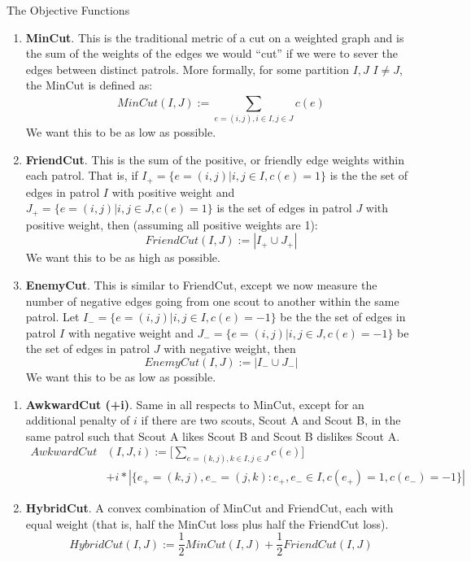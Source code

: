 \documentclass{beamer}
\begin{document}
\begin{frame}{The Objective Functions}

\begin{enumerate}
\scriptsize
\item \textbf{MinCut}. This is the traditional metric of a cut on a weighted graph and is the sum of the weights of the edges we would ``cut'' if we were to sever the edges between distinct patrols. More formally, for some partition $I, J$ $I \neq J$, the MinCut is defined as:
$$
MinCut(I, J) := \sum_{e = (i, j), i \in I, j \in J}^{} c(e)
$$
We want this to be as low as possible.
\item \textbf{FriendCut}. This is the sum of the positive, or friendly edge weights within each patrol. That is, if $I_+ = \{e=(i,j) | i,j \in I, c(e)=1\}$ is the the set of edges in patrol $I$ with positive weight and $J_+ = \{e=(i,j) | i,j \in J, c(e)=1\}$ is the set of edges in patrol $J$ with positive weight, then (assuming all positive weights are 1):
$$
FriendCut(I, J) :=  |I_+ \cup J_+|
$$
We want this to be as high as possible.
\item \textbf{EnemyCut}. This is similar to FriendCut, except we now measure the number of negative edges going from one scout to another within the same patrol. Let $I_- = \{e=(i,j) | i,j \in I, c(e)=-1\}$ be the the set of edges in patrol $I$ with negative weight and $J_- = \{e=(i,j) | i,j \in J, c(e)=-1\}$ be the set of edges in patrol $J$ with negative weight, then
$$
EnemyCut(I, J) := |I_- \cup J_-|
$$
    We want this to be as low as possible.
\end{enumerate}
\end{frame}

\begin{frame}
\begin{enumerate}
    \scriptsize
        \setcounter{enumi}{3}
\item \textbf{AwkwardCut (+i)}. Same in all respects to MinCut, except for an additional penalty of $i$ if there are two scouts, Scout A and Scout B, in the same patrol such that Scout A likes Scout B and Scout B dislikes Scout A.
\begin{equation*}
    \begin{split}
        AwkwardCut&(I, J, i) := \Bigg[ \sum_{e = (k, j), k \in I, j \in J}^{} c(e) \Bigg] \\
        &+ i * \left\vert{\{e_+ = (k,j), e_- = (j, k) : e_+, e_- \in I, c(e_+) = 1, c(e_-) = -1\}}\right\vert
    \end{split}
\end{equation*}

\item \textbf{HybridCut}. A convex combination of MinCut and FriendCut, each with equal weight (that is, half the MinCut loss plus half the FriendCut loss).
\begin{equation*}
    HybridCut(I, J) := \frac{1}{2}MinCut(I, J) + \frac{1}{2}FriendCut(I, J)
\end{equation*}
\end{enumerate}
\end{frame}
\end{document}
